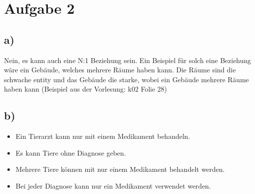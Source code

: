 \section*{Aufgabe 2}
\subsection*{a)}
Nein, es kann auch eine N:1 Beziehung sein. Ein Beispiel für solch eine Beziehung wäre ein Gebäude, welches mehrere Räume haben kann. Die Räume sind die schwache entity und das Gebäude die starke, wobei ein Gebäude mehrere Räume haben kann (Beispiel aus der Vorlesung: k02 Folie 28)
\subsection*{b)}
\begin{itemize}
\item Ein Tierarzt kann nur mit einem Medikament behandeln.
\item Es kann Tiere ohne Diagnose geben.
\item Mehrere Tiere können mit nur einem Medikament behandelt werden.
\item Bei jeder Diagnose kann nur ein Medikament verwendet werden.
\end{itemize}
